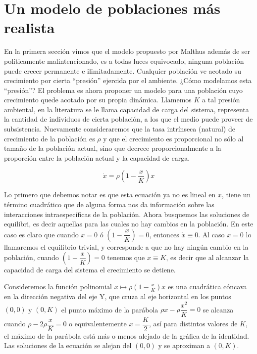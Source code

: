 \section{Un modelo de poblaciones más realista}

En la primera sección vimos que el modelo propuesto por Malthus  además de ser políticamente malintencionado, es a todas luces equivocado, ninguna población puede crecer permanente e ilimitadamente. Cualquier población ve acotado su crecimiento por cierta ``presión'' ejercida por el ambiente. ¿Cómo modelamos esta ``presión''? El problema es ahora proponer un modelo para una población cuyo crecimiento quede acotado por su propia dinámica. Llamemos $K$ a tal presión ambiental, en la literatura se le llama capacidad de carga del sistema, representa la cantidad de individuos de cierta población, a los que el medio puede proveer de subsistencia. Nuevamente consideraremos que la tasa intrínseca (natural) de crecimiento de la población es $\rho$ y que el crecimiento es proporcional no sólo al tamaño de la población actual, sino que decrece proporcionalmente a la proporción entre la población actual y la capacidad de carga.

\begin{equation}
    \dot{x}=\rho(1-\frac{x}{K})x
\end{equation}

Lo primero que debemos notar es que esta ecuación ya no es lineal en $x$, tiene un término cuadrático que de alguna forma nos da información sobre las interacciones intraespecíficas de la población. Ahora busquemos las soluciones de equilibri, es decir aquellas para las cuales no hay cambios en la población. En este caso es claro que cuando $x=0$ ó $\left(1-\dfrac{x}{K}\right)=0$, entonces $\dot{x}\equiv 0$. Al caso  $x=0$ lo llamaremos el equilibrio trivial, y corresponde a que no hay ningún cambio en la población, cuando   $\left(1-\dfrac{x}{K}\right)=0$ tenemos que $x\equiv K$, es decir que al alcanzar la capacidad de carga del sistema el crecimiento se detiene. 

Consideremos la función polinomial $x\mapsto \rho(1-\frac{x}{K})x$ es una cuadrática cóncava en la dirección negativa del eje $\mathrm{Y}$, que cruza al eje horizontal en los puntos $(0,0)$ y $(0,K)$ el punto máximo de la parábola $\rho x-\rho \dfrac{x^2}{K}=0$ se alcanza cuando $\rho-2\rho \dfrac{x}{K}=0$ o equivalentemente $x=\dfrac{K}{2}$, así para distintos valores de $K$, el máximo de la parábola está más o menos alejado de la gráfica de la identidad. Las soluciones de la ecuación se alejan del $(0,0)$ y se aproximan a $(0,K)$. 

